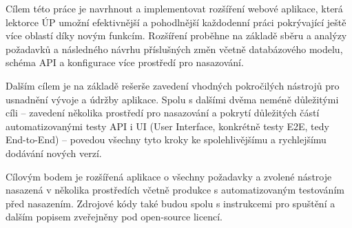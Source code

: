 Cílem této práce je navrhnout a implementovat rozšíření webové aplikace, která lektorce ÚP umožní efektivnější a pohodlnější každodenní práci pokrývající ještě více oblastí díky novým funkcím. Rozšíření proběhne na základě sběru a analýzy požadavků a následného návrhu příslušných změn včetně databázového modelu, schéma API a konfigurace více prostředí pro nasazování.

Dalším cílem je na základě rešerše zavedení vhodných pokročilých nástrojů pro usnadnění vývoje a údržby aplikace. Spolu s dalšími dvěma neméně důležitými cíli -- zavedení několika prostředí pro nasazování a pokrytí důležitých částí automatizovanými testy API i UI (User Interface, konkrétně testy E2E, tedy End-to-End) -- povedou všechny tyto kroky ke spolehlivějšímu a rychlejšímu dodávání nových verzí.

Cílovým bodem je rozšířená aplikace o všechny požadavky a zvolené nástroje nasazená v několika prostředích včetně produkce s automatizovaným testováním před nasazením. Zdrojové kódy také budou spolu s instrukcemi pro spuštění a dalším popisem zveřejněny pod open-source licencí.
